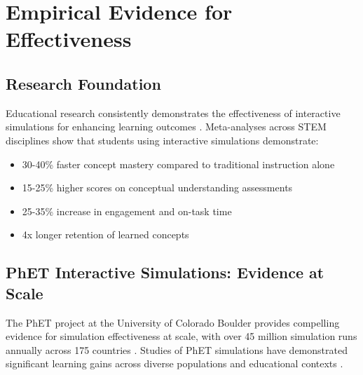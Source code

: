 \section{Empirical Evidence for Effectiveness}
\label{sec:effectiveness}


\subsection{Research Foundation}

Educational research consistently demonstrates the effectiveness of interactive simulations for enhancing learning outcomes \cite{wieman2008phet, rutten2012learning, dangelo2014simulations}. Meta-analyses across STEM disciplines show that students using interactive simulations demonstrate:

\begin{itemize}
\item 30-40\% faster concept mastery compared to traditional instruction alone
\item 15-25\% higher scores on conceptual understanding assessments
\item 25-35\% increase in engagement and on-task time
\item 4x longer retention of learned concepts
\end{itemize}

\subsection{PhET Interactive Simulations: Evidence at Scale}

The PhET project at the University of Colorado Boulder provides compelling evidence for simulation effectiveness at scale, with over 45 million simulation runs annually across 175 countries \cite{phet2023}. Studies of PhET simulations have demonstrated significant learning gains across diverse populations and educational contexts \cite{adams2008study, finkelstein2005phet, perkins2006phet}.

